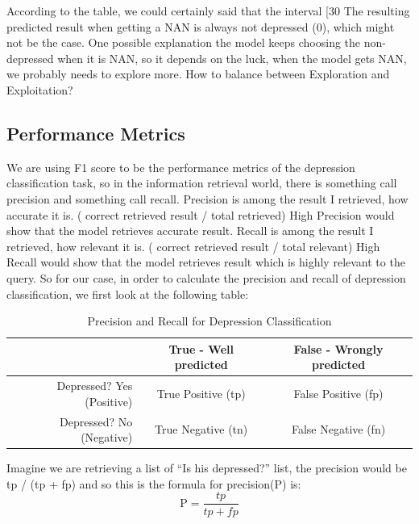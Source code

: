 \documentclass{article}
\begin{document}
    According to the table, we could certainly said that the interval [30%
    The resulting predicted result when getting a NAN is always not depressed (0), which might not be the case. One possible explanation the model keeps choosing the non-depressed when it is NAN, so it depends on the luck, when the model gets NAN, we probably needs to explore more.
    How to balance between Exploration and Exploitation?

    \subsection{Performance Metrics}
    We are using F1 score to be the performance metrics of the depression classification task, so in the information retrieval world, there is something call precision and something call recall.
    Precision is among the result I retrieved, how accurate it is. ( correct retrieved result / total retrieved) High Precision would show that the model retrieves accurate result.
    Recall is among the result I retrieved, how relevant it is. ( correct retrieved result / total relevant) High Recall would show that the model retrieves result which is highly relevant to the query.
    So for our case, in order to calculate the precision and recall of depression classification, we first look at the following table:

	\begin{table}[h!]
		\begin{center}
			\begin{tabular}{ | r | c | c | }
            \hline
                                            & \bfseries True - Well predicted	& \bfseries False - Wrongly predicted    \\ \hline
            Depressed? Yes (Positive)		& True Positive (tp) 	            & False Positive (fp)                    \\ \hline
            Depressed? No (Negative)	    & True Negative (tn) 	            & False Negative (fn)	    		     \\ \hline
            \end{tabular}
		\end{center}
		\caption{Precision and Recall for Depression Classification}
		\label{summary_table}
	\end{table}

    Imagine we are retrieving a list of “Is his depressed?” list, the precision would be tp / (tp + fp) and so this is the formula for precision(P) is:
    \begin{equation}\label{eq:prediction}
  	\text{P} = \frac{tp}{tp + fp}
 	\end{equation}
\end{document}

